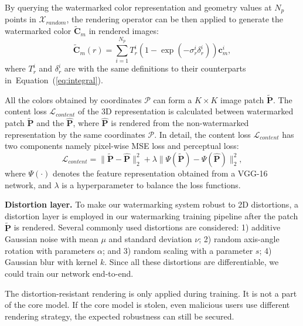\documentclass[10pt,twocolumn,letterpaper]{article}
\newcommand{\Eref}[1]{Equation~(\ref{#1})}
\begin{document}
By querying the watermarked color representation and geometry values at  $N_p$ points in $\mathcal{X}_{random}$, the rendering operator can be then applied to generate the watermarked color $\widetilde{\mathbf{C}}_m$ in rendered images:
\begin{equation}
  \widetilde{\mathbf{C}}_m(r)=\sum_{i=1}^{N_p} T_r^i (1-\exp \left(-\sigma_r^i \delta_r^i\right)) \mathbf{c}_m^i,
\end{equation}
where $T_r^i$ and $\delta_r^i$ are with the same definitions to their counterparts in~\Eref{eq:integral}.

All the colors obtained by  coordinates $\mathcal{P}$ can form a $K\times K$ image patch $\widetilde{\mathbf{P}}$. The content loss $\mathcal{L}_{content}$ of the 3D representation is calculated between watermarked patch $\widetilde{\mathbf{P}}$ and the $\hat{\mathbf{P}}$, where $\hat{\mathbf{P}}$ is rendered from the non-watermarked representation by the same coordinates $\mathcal{P}$.
In detail, the content loss $\mathcal{L}_{content}$ has two components namely pixel-wise MSE loss and perceptual loss:
\begin{equation}
  \mathcal{L}_{content} = \|\widetilde{\mathbf{P}}-\hat{\mathbf{P}}\|_2^2 + \lambda\|\Psi(\widetilde{\mathbf{P}}) - \Psi(\hat{\mathbf{P}})\|_2^2,
  \label{eq:content}
\end{equation}
where $\Psi(\cdot)$ denotes the feature representation obtained from a VGG-16 network, and $\lambda$ is a hyperparameter to balance the loss functions. 

\noindent\textbf{Distortion layer.}
To make our watermarking system robust to 2D distortions, a distortion layer is employed in our watermarking training pipeline after the patch $\widetilde{\mathbf{P}}$ is rendered. Several commonly used distortions are considered: 1) additive Gaussian noise with mean $\mu$ and standard deviation $\nu$; 2) random axis-angle rotation with parameters $\alpha$; and 3) random scaling with a parameter $s$; 4) Gaussian blur with kernel $k$. Since all these distortions are differentiable, we could train our network end-to-end. 

The distortion-resistant rendering is only applied during training. It is not a part of the core model. If the core model is stolen, even malicious users use different rendering strategy, the expected robustness can still be secured.
\end{document}
